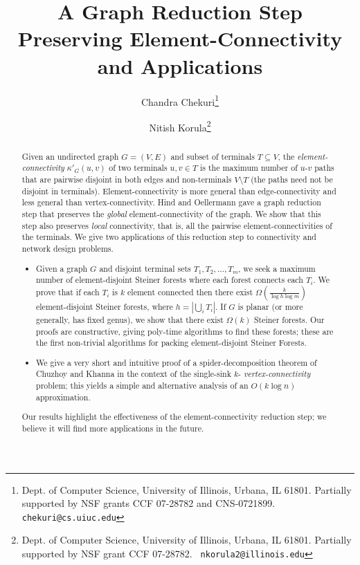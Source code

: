 \documentclass[11pt]{article}
\title{A Graph Reduction Step Preserving Element-Connectivity \\ and Applications}
\author{
Chandra Chekuri\thanks{Dept. of Computer Science, University of Illinois, 
Urbana, IL 61801. Partially supported by NSF grants CCF 07-28782 and 
CNS-0721899. {\tt chekuri@cs.uiuc.edu}}
  \and 
Nitish Korula\thanks{Dept. of Computer Science, University of Illinois, Urbana,
    IL 61801. Partially supported by NSF grant CCF 07-28782. {\tt
      nkorula2@illinois.edu}} 
}
\newcommand{\elconn}{\kappa'}
\begin{document}
\maketitle

\begin{abstract}
  Given an undirected graph $G=(V,E)$ and subset of terminals $T
  \subseteq V$, the {\em element-connectivity} $\elconn_G(u,v)$ of two
  terminals $u,v \in T$ is the maximum number of $u$-$v$ paths that
  are pairwise disjoint in both edges and non-terminals $V \setminus
  T$ (the paths need not be disjoint in terminals).
  Element-connectivity is more general than edge-connectivity and less
  general than vertex-connectivity. Hind and Oellermann \cite{hind}
  gave a graph reduction step that preserves the {\em global}
  element-connectivity of the graph.  We show that this step also
  preserves {\em local} connectivity, that is, all the pairwise
  element-connectivities of the terminals. We give two applications of
  this reduction step to connectivity and network design problems.
  \begin{itemize}
  \item Given a graph $G$ and disjoint terminal sets $T_1, T_2,
    \ldots, T_m$, we seek a maximum number of element-disjoint
    Steiner forests where each forest connects each $T_i$. We prove
    that if each $T_i$ is $k$ element connected then there exist
    $\Omega(\frac{k}{\log h \log m})$ element-disjoint Steiner
    forests, where $h = |\bigcup_i T_i|$. If $G$ is planar (or more
    generally, has fixed genus), we show that there exist $\Omega(k)$
    Steiner forests. Our proofs are constructive, giving poly-time
    algorithms to find these forests; these are the first non-trivial
    algorithms for packing element-disjoint Steiner Forests.
  
  \item We give a very short and intuitive proof of a
    spider-decomposition theorem of Chuzhoy and Khanna
    \cite{ChuzhoyK08} in the context of the single-sink $k$-{\em
      vertex-connectivity} problem; this yields a simple and
    alternative analysis of an $O(k \log n)$ approximation.
  \end{itemize}
  Our results highlight the effectiveness of the element-connectivity
  reduction step; we believe it will find more applications in the future.
\end{abstract}
\end{document}
